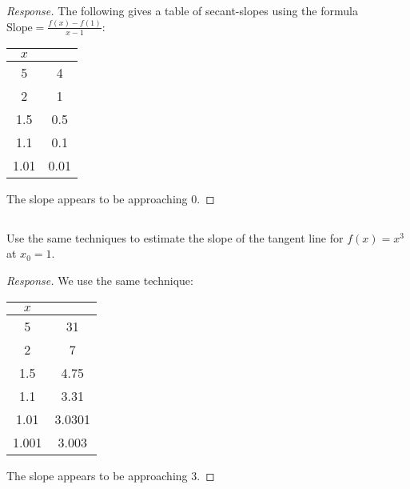 \documentclass[english]{article}
\newcommand{\prt}[1]{\setcounter{subsection}{#1-1}\subsection{}}
\theoremstyle{remark}
\theoremstyle{definition}
\begin{document}
\begin{proof}[Response]
	The following gives a table of secant-slopes using the formula $\text{Slope}=\frac{f(x)-f(1)}{x-1}$:
	\begin{table}[h!]\begin{tabular}{c|c}
			$x$&\text{Slope}\\\hline
		5 & 4 \\
		2 & 1 \\
		1.5 & 0.5 \\
		1.1 & 0.1 \\
		1.01 & 0.01 \\\end{tabular}\end{table}

The slope appears to be approaching 0.\end{proof}

\prt{2} Use the same techniques to estimate the slope of the tangent line for $f(x)=x^3$ at $x_0=1$.
\begin{proof}[Response]
	We use the same technique:\begin{table}[h!]\begin{tabular}{c|c}
			$x$&\text{Slope}\\\hline
		5 & 31 \\
		2 & 7 \\
		1.5 & 4.75 \\
		1.1 & 3.31 \\
		1.01 & 3.0301 \\
		1.001 & 3.003 \\\end{tabular}\end{table}
	
	The slope appears to be approaching 3.

\end{proof}
\end{document}
